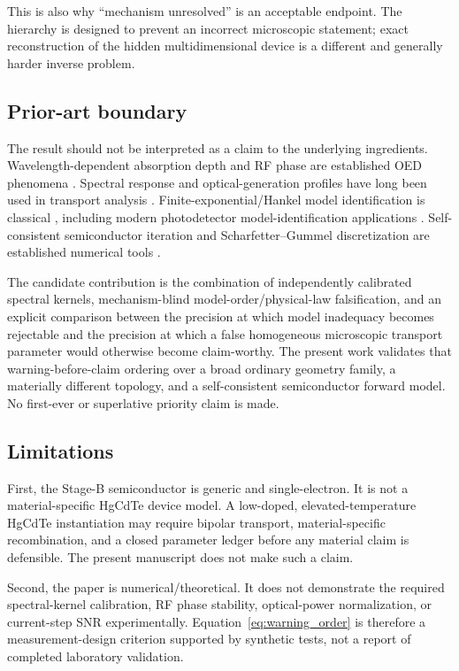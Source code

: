 \documentclass[11pt]{article}
\begin{document}
This is also why ``mechanism unresolved'' is an acceptable endpoint. The hierarchy is designed to prevent an incorrect microscopic statement; exact reconstruction of the hidden multidimensional device is a different and generally harder inverse problem.

\subsection{Prior-art boundary}

The result should not be interpreted as a claim to the underlying ingredients. Wavelength-dependent absorption depth and RF phase are established OED phenomena \cite{Glasser2021,Liokumovitch2021,Dutta2024}. Spectral response and optical-generation profiles have long been used in transport analysis \cite{Goodman1961,Geist1980,Halme2008}. Finite-exponential/Hankel model identification is classical \cite{Prony1795,RoyKailath1989,HuaSarkar1990}, including modern photodetector model-identification applications \cite{Sun2025}. Self-consistent semiconductor iteration and Scharfetter--Gummel discretization are established numerical tools \cite{Gummel1964,ScharfetterGummel1969}.

The candidate contribution is the combination of independently calibrated spectral kernels, mechanism-blind model-order/physical-law falsification, and an explicit comparison between the precision at which model inadequacy becomes rejectable and the precision at which a false homogeneous microscopic transport parameter would otherwise become claim-worthy. The present work validates that warning-before-claim ordering over a broad ordinary geometry family, a materially different topology, and a self-consistent semiconductor forward model. No first-ever or superlative priority claim is made.

\subsection{Limitations}

First, the Stage-B semiconductor is generic and single-electron. It is not a material-specific HgCdTe device model. A low-doped, elevated-temperature HgCdTe instantiation may require bipolar transport, material-specific recombination, and a closed parameter ledger before any material claim is defensible. The present manuscript does not make such a claim.

Second, the paper is numerical/theoretical. It does not demonstrate the required spectral-kernel calibration, RF phase stability, optical-power normalization, or current-step SNR experimentally. Equation~\eqref{eq:warning_order} is therefore a measurement-design criterion supported by synthetic tests, not a report of completed laboratory validation.
\end{document}
